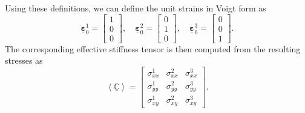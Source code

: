 \documentclass[pdflatex,sn-mathphys-num]{sn-jnl}%
\theoremstyle{thmstyleone}%
\theoremstyle{thmstyletwo}%
\theoremstyle{thmstylethree}%
\begin{document}
Using these definitions, we can define the unit strains in Voigt form as
\begin{equation}
\underline{\boldsymbol{\varepsilon}}_0^1 =
\begin{bmatrix} 1 \\ 0 \\ 0 \end{bmatrix}, \quad
\underline{\boldsymbol{\varepsilon}}_0^2 =
\begin{bmatrix} 0 \\ 1 \\ 0 \end{bmatrix}, \quad
\underline{\boldsymbol{\varepsilon}}_0^3 =
\begin{bmatrix} 0 \\ 0 \\ 1 \end{bmatrix}.
\end{equation}
The corresponding effective stiffness tensor is then computed from the resulting stresses as
\begin{equation}
    \left< \underline{\boldsymbol{\mathbb{C}}} \right> =
    \begin{bmatrix}
         \sigma_{xx}^1 & \sigma_{xx}^2 & \sigma_{xx}^3 \\
         \sigma_{yy}^1 & \sigma_{yy}^2 & \sigma_{yy}^3 \\
         \sigma_{xy}^1 & \sigma_{xy}^2 & \sigma_{xy}^3
     \end{bmatrix}.
\end{equation}
\end{document}
